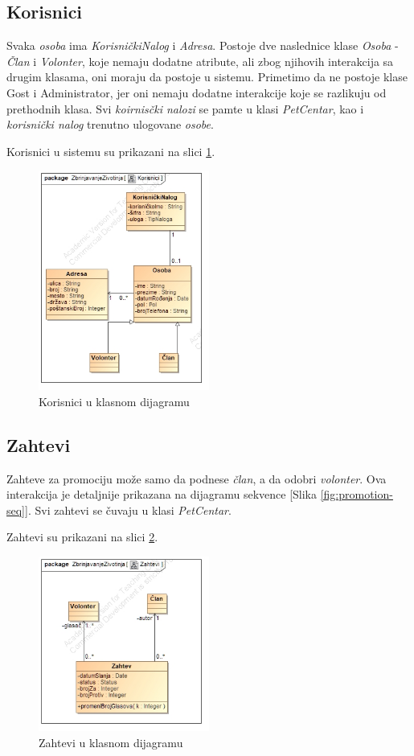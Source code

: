 \subsection{Korisnici}
\par Svaka \textit{osoba} ima \textit{KorisničkiNalog} i \textit{Adresa}.
Postoje dve naslednice klase \textit{Osoba} - \textit{Član} i \textit{Volonter}, koje nemaju dodatne atribute, ali zbog njihovih interakcija
sa drugim klasama, oni moraju da postoje u sistemu. Primetimo da ne postoje klase Gost i Administrator, jer oni nemaju dodatne interakcije
koje se razlikuju od prethodnih klasa. Svi \textit{koirnisčki nalozi} se pamte u klasi \textit{PetCentar}, kao i \textit{korisnički nalog} trenutno
ulogovane \textit{osobe}.
\par Korisnici u sistemu su prikazani na slici \ref{fig:users}. 
\begin{figure}[h]
    \centering
    \includegraphics[width=0.5\textwidth, height=0.4\textwidth]{img/users.jpg}
    \caption{Korisnici u klasnom dijagramu}
    \label{fig:users}
\end{figure}
\subsection{Zahtevi}
\par Zahteve za promociju može samo da podnese \textit{član}, a da odobri \textit{volonter}. Ova interakcija je detaljnije prikazana 
na dijagramu sekvence [Slika \ref{fig:promotion-seq}]. Svi zahtevi se čuvaju u klasi \textit{PetCentar}.
\par Zahtevi su prikazani na slici \ref{fig:reqs}.
\begin{figure}[h]
    \centering
    \includegraphics[width=0.5\textwidth, height=0.4\textwidth]{img/requests.jpg}
    \caption{Zahtevi u klasnom dijagramu}
    \label{fig:reqs}
\end{figure}

